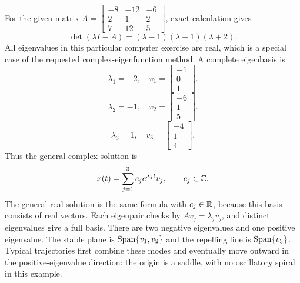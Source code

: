 For the given matrix $A=\left[\begin{matrix}-8 & -12 & -6\\2 & 1 & 2\\7 & 12 & 5\end{matrix}\right]$, exact calculation gives
\[\det(\lambda I-A)=\left(\lambda - 1\right) \left(\lambda + 1\right) \left(\lambda + 2\right).\]
All eigenvalues in this particular computer exercise are real,
which is a special case of the requested complex-eigenfunction method.
A complete eigenbasis is
\[\lambda_1=-2,\quad v_1=\left[\begin{matrix}-1\\0\\1\end{matrix}\right].\]
\[\lambda_2=-1,\quad v_2=\left[\begin{matrix}-6\\1\\5\end{matrix}\right].\]
\[\lambda_3=1,\quad v_3=\left[\begin{matrix}-4\\1\\4\end{matrix}\right].\]
Thus the general complex solution is
\[x(t)=\sum_{j=1}^3 c_j e^{\lambda_jt}v_j,\qquad c_j\in\mathbb{C}.\]
The general real solution is the same formula with $c_j\in\mathbb{R}$,
because this basis consists of real vectors. Each eigenpair checks by
$Av_j=\lambda_jv_j$, and distinct eigenvalues give a full basis.
There are two negative eigenvalues and one positive eigenvalue.
The stable plane is $\operatorname{Span}\{v_1,v_2\}$ and the repelling line is
$\operatorname{Span}\{v_3\}$. Typical trajectories first combine these modes
and eventually move outward in the positive-eigenvalue direction:
the origin is a saddle, with no oscillatory spiral in this example.

